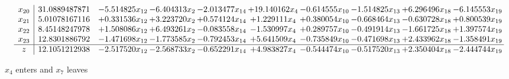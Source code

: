 \documentclass[10pt]{article}
\begin{document}
\[\begin{array}{c| c c@{\hskip 2pt} c@{\hskip 2pt} c@{\hskip 2pt} c@{\hskip 2pt} c@{\hskip 2pt} c@{\hskip 2pt} c@{\hskip 2pt} c@{\hskip 2pt} }
 x_{20}   &  31.0889487871 & -5.514825 x_{12} & -6.404313 x_{2} & -2.013477 x_{14} & + 19.140162 x_{4} & -0.614555 x_{10} & -1.514825 x_{13} & + 6.296496 x_{18} & -6.145553 x_{19}\\
 x_{21}   &  5.01078167116 & + 0.331536 x_{12} & + 3.223720 x_{2} & + 0.574124 x_{14} & + 1.229111 x_{4} & + 0.380054 x_{10} & -0.668464 x_{13} & -0.630728 x_{18} & + 0.800539 x_{19}\\
 x_{22}   &  8.45148247978 & + 1.508086 x_{12} & + 6.493261 x_{2} & -0.083558 x_{14} & -1.530997 x_{4} & + 0.289757 x_{10} & -0.491914 x_{13} & -1.661725 x_{18} & + 1.397574 x_{19}\\
 x_{23}   &  12.8301886792 & -1.471698 x_{12} & -1.773585 x_{2} & -0.792453 x_{14} & + 5.641509 x_{4} & -0.735849 x_{10} & -0.471698 x_{13} & + 2.433962 x_{18} & -1.358491 x_{19}\\
\hline
z    &  12.1051212938 & -2.517520 x_{12} & -2.568733 x_{2} & -0.652291 x_{14} & + 4.983827 x_{4} & -0.544474 x_{10} & -0.517520 x_{13} & + 2.350404 x_{18} & -2.444744 x_{19}\\
\end{array}\]


 $ x_{4} $ enters and $ x_{7} $ leaves 
\end{document}
